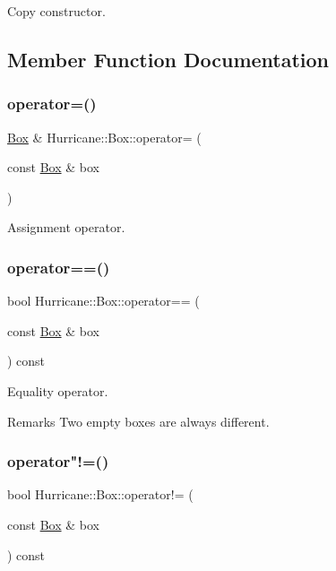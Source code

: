 Copy constructor. 

\subsection{Member Function Documentation}
\mbox{\label{classHurricane_1_1Box_a01abf59b3d3e99e694a7d4789f1bb978}} 
\subsubsection{\texorpdfstring{operator=()}{operator=()}}
{\footnotesize\ttfamily \mbox{\hyperlink{classHurricane_1_1Box}{Box}} \& Hurricane\+::\+Box\+::operator= (\begin{DoxyParamCaption}\item[{const \mbox{\hyperlink{classHurricane_1_1Box}{Box}} \&}]{box }\end{DoxyParamCaption})}

Assignment operator. \mbox{\label{classHurricane_1_1Box_a2a363ad0fdfda5a2f56b1b62a8665703}} 
\subsubsection{\texorpdfstring{operator==()}{operator==()}}
{\footnotesize\ttfamily bool Hurricane\+::\+Box\+::operator== (\begin{DoxyParamCaption}\item[{const \mbox{\hyperlink{classHurricane_1_1Box}{Box}} \&}]{box }\end{DoxyParamCaption}) const}

Equality operator.

\begin{DoxyRemark}{Remarks}
Two empty boxes are always different. 
\end{DoxyRemark}
\mbox{\label{classHurricane_1_1Box_a77a0e8c424c246973c455ce8e3ada8fb}} 
\subsubsection{\texorpdfstring{operator"!=()}{operator!=()}}
{\footnotesize\ttfamily bool Hurricane\+::\+Box\+::operator!= (\begin{DoxyParamCaption}\item[{const \mbox{\hyperlink{classHurricane_1_1Box}{Box}} \&}]{box }\end{DoxyParamCaption}) const}

